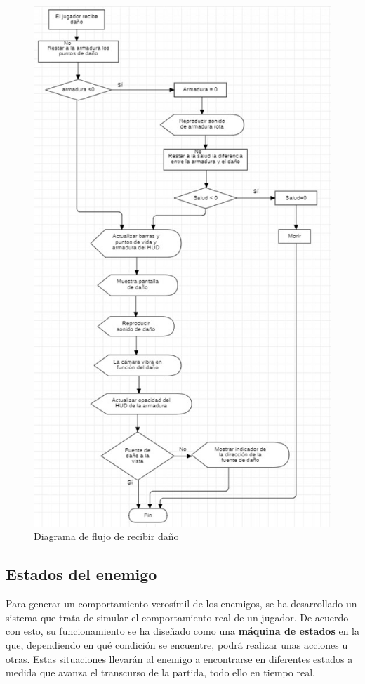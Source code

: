 \begin{figure}[h]
    \centering
    \includegraphics[scale=0.5]{img/DamageFlowchart.jpg}
    \caption{Diagrama de flujo de recibir daño}
    \label{fig:DiagramaDaño}
    \end{figure}

\subsection{Estados del enemigo}
Para generar un comportamiento verosímil de los enemigos, se ha desarrollado un sistema que trata de simular el comportamiento real de un jugador.  De acuerdo con esto, su funcionamiento se ha diseñado como una \textbf{máquina de estados} en la que, dependiendo en qué condición se encuentre, podrá realizar unas acciones u otras. Estas situaciones llevarán al enemigo a encontrarse en diferentes estados a medida que avanza el transcurso de la partida, todo ello en tiempo real.

